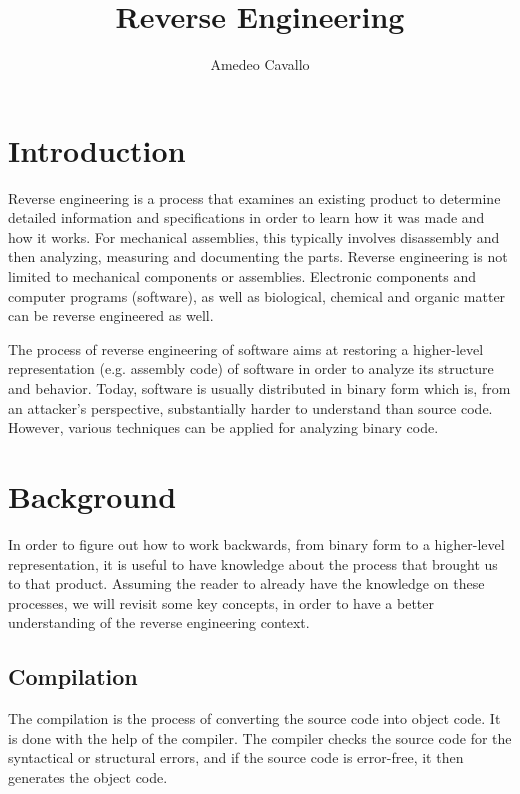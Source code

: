 \documentclass{article}
\author{Amedeo Cavallo}
\title{Reverse Engineering}
\date{}
\begin{document}
 

\maketitle

\section{Introduction} 

Reverse engineering is a process that examines an existing product to determine detailed information 
and specifications in order to learn how it was made and how it works. For mechanical assemblies, this typically 
involves disassembly and then analyzing, measuring and documenting the parts. Reverse engineering is not limited 
to mechanical components or assemblies. Electronic components and computer programs (software), as well as biological, 
chemical and organic matter can be reverse engineered as well. \citep{reveng}

The process of reverse engineering of software aims at restoring a higher-level representation (e.g. assembly code) 
of software in order to analyze its structure and behavior. Today, software is usually distributed in binary form 
which is, from an attacker’s perspective, substantially harder to understand than source code.
However, various techniques can be applied for analyzing binary code. \citep{codeobf}

\section{Background}

In order to figure out how to work backwards, from binary form to a higher-level representation, it is useful 
to have knowledge about the process that brought us to that product. Assuming the reader to already have the knowledge on 
these processes, we will revisit some key concepts, in order to have a better understanding of the reverse engineering context.

\subsection{Compilation}

The compilation is the process of converting the source code into object code. It is done with the help of the compiler. 
The compiler checks the source code for the syntactical or structural errors, and if the source code is error-free, 
it then generates the object code. \citep{compil}
\end{document}
